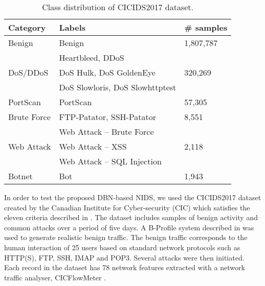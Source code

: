 \documentclass[runningheads]{llncs}
\begin{document}
\begin{table}[t]
\centering
\caption{Class distribution of CICIDS2017 dataset.}
\begin{tabular}{p{2.5cm}p{5cm}p{2cm}}
\toprule
\bf Category & \bf Labels & \bf \# samples \\
\midrule
Benign                         & Benign                          & 1,807,787                  \\\midrule
\multirow{3}{6em}{DoS/DDoS}    & Heartbleed, DDoS                & \multirow{3}{6em}{320,269} \\
                               & DoS Hulk, DoS GoldenEye         &                            \\
                               & DoS Slowloris, DoS Slowhttptest &                            \\\midrule
PortScan                       & PortScan                        & 57,305                     \\\midrule
Brute Force                    & FTP-Patator, SSH-Patator        & 8,551                      \\\midrule
\multirow{3}{6em}{Web Attack}  & Web Attack – Brute Force        & \multirow{3}{6em}{2,118}   \\
                               & Web Attack – XSS                &                            \\
                               & Web Attack – SQL Injection      &                            \\\midrule
Botnet                         & Bot                             & 1,943                      \\
\bottomrule
\end{tabular}
\label{tab:class_distribution}
\end{table}

In order to test the proposed \ac{DBN}-based NIDS, we used the CICIDS2017 dataset created by the Canadian Institute for Cyber-security (CIC) which satisfies the eleven criteria described in \cite{Sharafaldin}. The dataset includes samples of benign activity and common attacks over a period of five days. A B-Profile system described in \cite{Sharafaldin} was used to generate realistic benign traffic. The benign traffic corresponds to the human interaction of 25 users based on standard network protocols such as HTTP(S), FTP, SSH, IMAP and POP3. Several attacks were then initiated. Each record in the dataset has 78 network features extracted with a network traffic analyser, CICFlowMeter \cite{Sharafaldin}.
\end{document}
